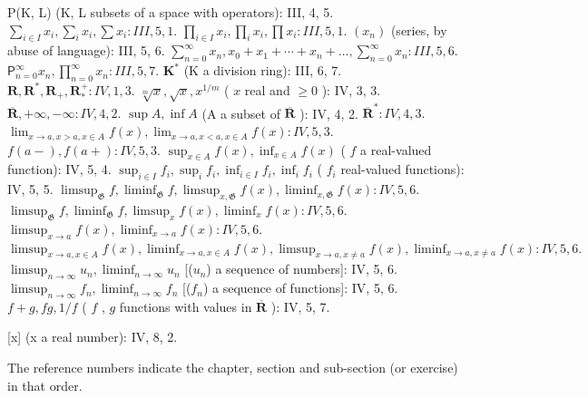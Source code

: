 P(K, L) (K, L subsets of a space with operators): III, 4, 5. \(\sum_{i \in I} x_i, \sum_{i} x_i, \sum x_i: III, 5, 1.\) \(\prod_{i \in I} x_i, \prod_{i} x_i, \prod x_i: III, 5, 1.\) \((x_n)\) (series, by abuse of language): III, 5, 6. \(\sum_{n=0}^{\infty} x_n, x_0 + x_1 + \cdots + x_n + \ldots, \sum_{n=0}^{\infty} x_n: III, 5, 6.\) \(\mathsf{P}_{n=0}^{\infty} x_n, \prod_{n=0}^{\infty} x_n: III, 5, 7.\) \(\mathbf{K}^*\) (K a division ring): III, 6, 7. \(\mathbf{R}, \mathbf{R}^*, \mathbf{R}_+, \mathbf{R}_*^+: IV, 1, 3.\) \(\sqrt[m]{x}, \sqrt{x}, x^{1/m}\) ( \(x\) real and \(\geqslant 0\) ): IV, 3, 3. \(\overline{\mathbf{R}}, +\infty, -\infty: IV, 4, 2.\) \(\sup A, \inf A\) (A a subset of \(\overline{\mathbf{R}}\) ): IV, 4, 2. \(\overline{\mathbf{R}}^*: IV, 4, 3.\) \(\lim_{x \to a, x > a, x \in A} f(x), \lim_{x \to a, x < a, x \in A} f(x): IV, 5, 3.\) \(f(a - ), f(a + ): IV, 5, 3.\) \(\sup_{x \in A} f(x), \inf_{x \in A} f(x)\) ( \(f\) a real-valued function): IV, 5, 4. \(\sup_{i \in I} f_i, \sup_{i} f_i, \inf_{i \in I} f_i, \inf_{i} f_i\) ( \(f_i\) real-valued functions): IV, 5, 5. \(\limsup_{\mathfrak{G}} f, \liminf_{\mathfrak{G}} f, \limsup_{x,\mathfrak{G}} f(x), \liminf_{x,\mathfrak{G}} f(x): IV, 5, 6.\) \(\limsup_{\mathfrak{G}} f, \liminf_{\mathfrak{G}} f, \limsup_{x} f(x), \liminf_{x} f(x): IV, 5, 6.\) \(\limsup_{x \to a} f(x), \liminf_{x \to a} f(x): IV, 5, 6.\) \(\limsup_{x \to a, x \in A} f(x), \liminf_{x \to a, x \in A} f(x), \limsup_{x \to a, x \neq a} f(x), \liminf_{x \to a, x \neq a} f(x): IV, 5, 6.\) \(\limsup_{n \to \infty} u_n, \liminf_{n \to \infty} u_n\) {[}(\(u_n\)) a sequence of numbers{]}: IV, 5, 6. \(\limsup_{n \to \infty} f_n, \liminf_{n \to \infty} f_n\) {[}(\(f_n\)) a sequence of functions{]}: IV, 5, 6. \(f + g, fg, 1/f\) ( \(f\) , \(g\) functions with values in \(\overline{\mathbf{R}}\) ): IV, 5, 7.

{[}x{]} (x a real number): IV, 8, 2.


The reference numbers indicate the chapter, section and sub-section (or exercise) in that order.

